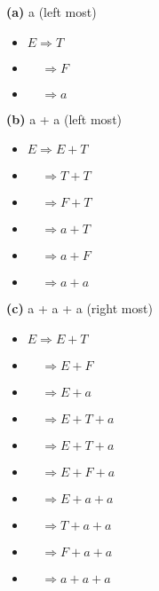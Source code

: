 \documentclass[11pt]{article}
\newcommand{\question}[2] {\vspace{.25in} \fbox{#1} #2 \vspace{.10in}}
\renewcommand{\part}[1] {\vspace{.10in} {\bf (#1)}}
\begin{document}
\question{5}{ }

\part{a} a (left most)
\begin{itemize}
\item $E \Rightarrow T$
\item $\;\;\;\;\Rightarrow F$
\item $\;\;\;\;\Rightarrow a$
\end{itemize}



\pagebreak

\part{b} a + a (left most)
\begin{itemize}
\item $E \Rightarrow E + T$
\item $\;\;\;\;\Rightarrow T + T$
\item $\;\;\;\;\Rightarrow F + T$
\item $\;\;\;\;\Rightarrow a + T$
\item $\;\;\;\;\Rightarrow a + F$
\item $\;\;\;\;\Rightarrow a + a$
\end{itemize}



\pagebreak

\part{c} a + a + a (right most)

\begin{itemize}
\item $E \Rightarrow E + T$
\item $\;\;\;\;\Rightarrow E + F$
\item $\;\;\;\;\Rightarrow E + a$
\item $\;\;\;\;\Rightarrow E + T + a$
\item $\;\;\;\;\Rightarrow E + T + a$
\item $\;\;\;\;\Rightarrow E + F + a$
\item $\;\;\;\;\Rightarrow E + a + a$
\item $\;\;\;\;\Rightarrow T + a + a$
\item $\;\;\;\;\Rightarrow F + a + a$
\item $\;\;\;\;\Rightarrow a + a + a$
\end{itemize}
\end{document}
